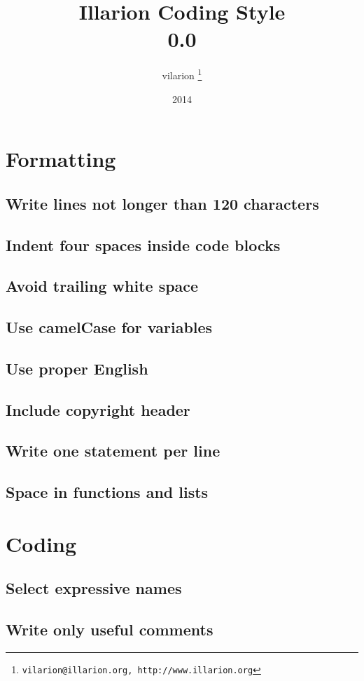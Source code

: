 \documentclass[a4paper,10pt]{scrreprt}
\begin{document}
\title{Illarion Coding Style\\0.0}
\author{vilarion \thanks{ \texttt{vilarion@illarion.org, http://www.illarion.org}}}
\date{2014}
\maketitle
\tableofcontents

\chapter{Formatting}
\section{Write lines not longer than 120 characters}
\section{Indent four spaces inside code blocks}
\section{Avoid trailing white space}
\section{Use camelCase for variables}
\section{Use proper English}
\section{Include copyright header}
\section{Write one statement per line}
\section{Space in functions and lists}

\chapter{Coding}
\section{Select expressive names}
\section{Write only useful comments}
\end{document}
